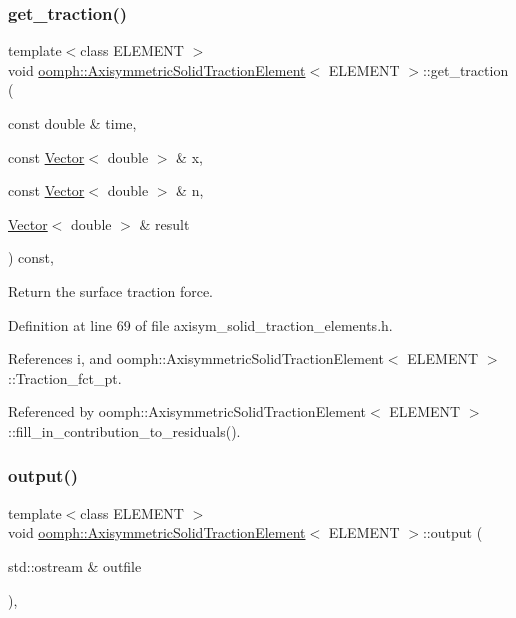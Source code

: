 \subsubsection{\texorpdfstring{get\+\_\+traction()}{get\_traction()}}
{\footnotesize\ttfamily template$<$class E\+L\+E\+M\+E\+NT $>$ \\
void \hyperlink{classoomph_1_1AxisymmetricSolidTractionElement}{oomph\+::\+Axisymmetric\+Solid\+Traction\+Element}$<$ E\+L\+E\+M\+E\+NT $>$\+::get\+\_\+traction (\begin{DoxyParamCaption}\item[{const double \&}]{time,  }\item[{const \hyperlink{classoomph_1_1Vector}{Vector}$<$ double $>$ \&}]{x,  }\item[{const \hyperlink{classoomph_1_1Vector}{Vector}$<$ double $>$ \&}]{n,  }\item[{\hyperlink{classoomph_1_1Vector}{Vector}$<$ double $>$ \&}]{result }\end{DoxyParamCaption}) const\hspace{0.3cm}{\ttfamily [inline]}, {\ttfamily [protected]}}



Return the surface traction force. 



Definition at line 69 of file axisym\+\_\+solid\+\_\+traction\+\_\+elements.\+h.



References i, and oomph\+::\+Axisymmetric\+Solid\+Traction\+Element$<$ E\+L\+E\+M\+E\+N\+T $>$\+::\+Traction\+\_\+fct\+\_\+pt.



Referenced by oomph\+::\+Axisymmetric\+Solid\+Traction\+Element$<$ E\+L\+E\+M\+E\+N\+T $>$\+::fill\+\_\+in\+\_\+contribution\+\_\+to\+\_\+residuals().

\mbox{\label{classoomph_1_1AxisymmetricSolidTractionElement_a26333e5b7fd2aabb61d21f3289797b27}} 
\subsubsection{\texorpdfstring{output()}{output()}\hspace{0.1cm}{\footnotesize\ttfamily [1/4]}}
{\footnotesize\ttfamily template$<$class E\+L\+E\+M\+E\+NT $>$ \\
void \hyperlink{classoomph_1_1AxisymmetricSolidTractionElement}{oomph\+::\+Axisymmetric\+Solid\+Traction\+Element}$<$ E\+L\+E\+M\+E\+NT $>$\+::output (\begin{DoxyParamCaption}\item[{std\+::ostream \&}]{outfile }\end{DoxyParamCaption})\hspace{0.3cm}{\ttfamily [inline]}, {\ttfamily [virtual]}}



